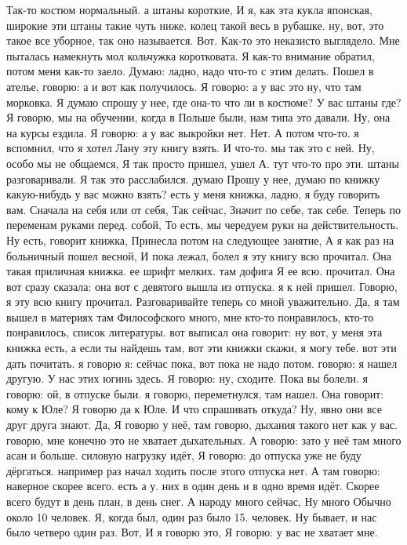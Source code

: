Так-то костюм нормальный.
а штаны короткие, И я, как эта кукла японская, широкие эти штаны такие чуть ниже.
колец такой весь в рубашке. ну, вот, это такое все уборное, так оно называется.
Вот.
Как-то это неказисто выглядело.
Мне пыталась намекнуть мол кольчужка коротковата.
Я как-то внимание обратил, потом меня как-то заело.
Думаю: ладно, надо что-то с этим делать.
Пошел в ателье, говорю: а и вот как получилось.
Я говорю: а у вас это ну, что там морковка.
Я думаю спрошу у нее, где она-то что ли в костюме?
У вас штаны где?
Я говорю, мы на обучении, когда в Польше были, нам типа это давали.
Ну, она на курсы ездила.
Я говорю: а у вас выкройки нет.
Нет.
А потом что-то. я вспомнил, что я хотел Лану эту книгу взять.
И что-то.
мы так это с ней.
Ну, особо мы не общаемся, Я так просто пришел, ушел А.
тут что-то про эти.
штаны разговаривали. Я так это расслабился. думаю Прошу у нее, думаю по книжку какую-нибудь у вас можно взять?
есть у меня книжка, ладно, я буду говорить вам.
Сначала на себя или от себя, Так сейчас, Значит по себе, так себе.
Теперь по переменам руками перед.
собой, То есть, мы чередуем руки на действительность. Ну есть, говорит книжка, Принесла потом на следующее занятие, А я как раз на больничный пошел весной, И пока лежал, болел я эту
книгу всю прочитал. Она такая приличная книжка.
ее шрифт мелких.
там дофига Я ее всю.
прочитал.
Она вот сразу сказала: она вот с девятого вышла из отпуска. я к ней пришел.
Говорю, я эту всю книгу прочитал.
Разговаривайте теперь со мной уважительно.
Да, я там вышел в материях там Философского много, мне кто-то понравилось, кто-то понравилось, список литературы. вот выписал она говорит: ну вот, у меня эта книжка есть, а если ты найдешь там, вот эти книжки скажи, я могу тебе.
вот эти дать почитать. я говорю я:
сейчас пока, вот пока не надо потом.
говорю: я нашел другую.
У нас этих югинь здесь.
Я говорю: ну, сходите.
Пока вы болели. я говорю: ой, в отпуске были. я говорю, переметнулся, там нашел.
Она говорит: кому к Юле?
Я говорю да к Юле.
И что спрашивать откуда?
Ну, явно они все друг друга знают.
Да, Я говорю у неё, там говорю, дыхания такого нет как у вас. говорю, мне конечно это не хватает дыхательных.
А говорю: зато у неё там много асан и больше.
силовую нагрузку идёт, Я говорю: до отпуска уже не буду дёргаться.
например раз начал ходить после этого отпуска нет. А там говорю: наверное скорее всего.
есть а у.
них в один день и в одно время идёт.
Скорее всего будут в день план, в день снег. А народу много сейчас, Ну много Обычно около 10 человек.
Я, когда был, один раз было 15.
человек. Ну бывает, и нас было четверо один раз. Вот, И я говорю это, Я говорю: у вас не хватает мне.
